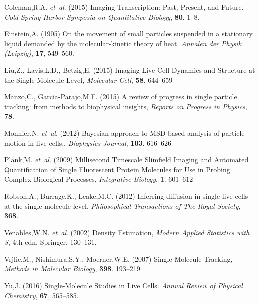 \documentclass{bioinfo}
\begin{document}
%
%
%
%

%
%


\begin{thebibliography}{}

Coleman,R.A. \textit{et~al}. (2015) Imaging Transcription: Past, Present, and Future. \textit{Cold Spring Harbor Symposia on Quantitative Biology}, \textbf{80}, 1--8.

Einstein,A. (1905) On the movement of small particles suspended in a stationary liquid demanded by the molecular-kinetic theory of heat. \textit{Annalen der Physik (Leipzig)}, \textbf{17}, 549--560.

 Liu,Z., Lavis,L.D., Betzig,E. (2015) Imaging Live-Cell Dynamics and Structure at the Single-Molecule Level, {\it Molecular Cell}, {\bf 58}. 644--659

 Manzo,C., Garcia-Parajo,M.F. (2015) A review of progress in single particle tracking: from methods to biophysical insights, {\it Reports on Progress in Physics}, {\bf 78}.

 Monnier,N. \textit{et~al}. (2012) Bayesian approach to MSD-based analysis of particle motion in live cells., {\it Biophysics Journal}, {\bf 103}. 616--626

 Plank,M. \textit{et~al}. (2009) Millisecond Timescale Slimfield Imaging and Automated Quantification of Single Fluorescent Protein Molecules for Use in Probing Complex Biological Processes, {\it Integrative Biology}, {\bf 1}. 601--612

 Robson,A., Burrage,K., Leake,M.C. (2012) Inferring diffusion in single live cells at the single-molecule level, {\it Philosophical Transactions of The Royal Society}, {\bf 368}.

Venables,W.N. \textit{et~al}. (2002) Density Estimation, \textit{Modern Applied Statistics with S}, 4th edn. Springer, 130--131.

 Vrjlic,M., Nishimura,S.Y., Moerner,W.E. (2007) Single-Molecule Tracking, {\it Methods in Molecular Biology}, {\bf 398}. 193--219

Yu,J. (2016) Single-Molecule Studies in Live Cells. \textit{Annual Review of Physical Chemistry}, \textbf{67}, 565--585.

\end{thebibliography}
\end{document}
